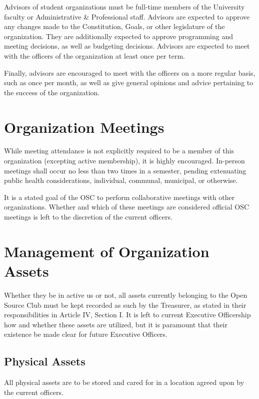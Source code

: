 \documentclass[12pt,letterpaper]{article}
\begin{document}
Advisors of student organizations must be full-time members of the University faculty or
Administrative \& Professional staff. Advisors are expected to approve any changes made to
the Constitution, Goals, or other legislature of the organization. They are additionally
expected to approve programming and meeting decisions, as well as budgeting decisions.
Advisors are expected to meet with the officers of the organization at least once per term.

Finally, advisors are encouraged to meet with the officers on a more regular basis, such
as once per month, as well as give general opinions and advice pertaining to the success
of the organization.

\section{Organization Meetings}

While meeting attendance is not explicitly required to be a member of this organization
(excepting active membership), it is highly encouraged. In-person meetings shall occur
no less than two times in a semester, pending extenuating public health considerations,
individual, communal, municipal, or otherwise.

It is a stated goal of the OSC to perform collaborative meetings with other
organizations. Whether and which of these meetings are considered official OSC meetings
is left to the discretion of the current officers.

\section{Management of Organization Assets}

Whether they be in active us or not, all assets currently belonging to the Open Source
Club must be kept recorded as such by the Treasurer, as stated in their responsibilities
in Article IV, Section I. It is left to current Executive Officership how and whether
these assets are utilized, but it is paramount that their existence be made clear for
future Executive Officers.

\subsection{Physical Assets}

All physical assets are to be stored and cared for in a location agreed upon by the current
officers.
\end{document}
